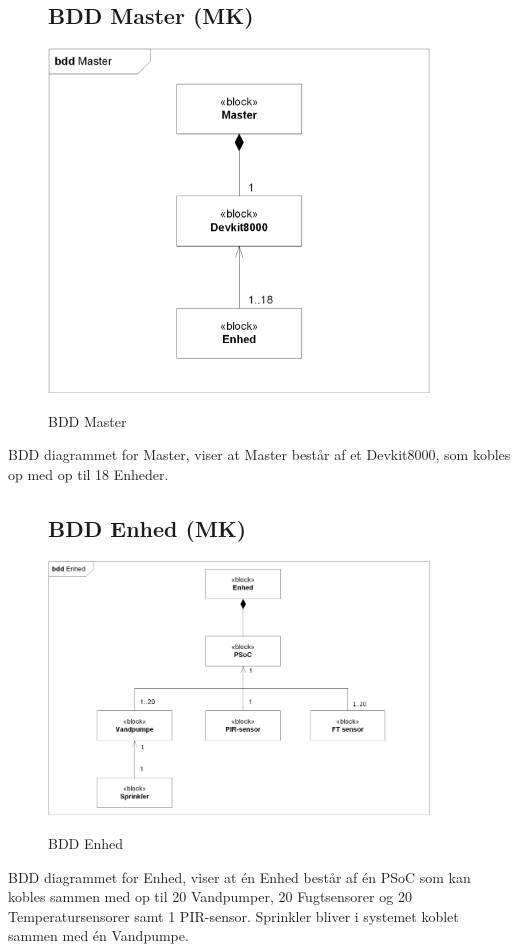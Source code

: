 \begin{figure}[H] \centering
\subsection{BDD Master (MK)}
{\includegraphics[width=0.9\textwidth]{filer/systemarkitektur/BDD_Master}}
\caption{BDD Master}
\label{lab:bddmaster}
\raggedright
\end{figure}
BDD diagrammet for Master, viser at Master består af et Devkit8000, som kobles op med op til 18 Enheder.

\begin{figure}[H] \centering
\subsection{BDD Enhed (MK)}
{\includegraphics[width=0.9\textwidth]{filer/systemarkitektur/BDD_Enhed}}
\caption{BDD Enhed}
\label{lab:bddenhed}
\raggedright
\end{figure}
BDD diagrammet for Enhed, viser at én Enhed består af én PSoC som kan kobles sammen med op til 20 Vandpumper, 20 Fugtsensorer og 20 Temperatursensorer samt 1 PIR-sensor. Sprinkler bliver i systemet koblet sammen med én Vandpumpe.

